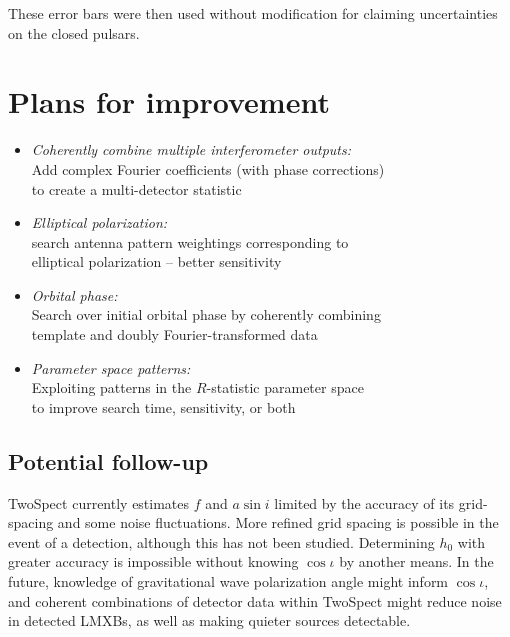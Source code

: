 These error bars were then used without modification for claiming uncertainties on the closed pulsars.



\section{Plans for improvement}

\begin{itemize}
\item \emph{Coherently combine multiple interferometer outputs: }\\
Add complex Fourier coefficients (with phase corrections)\\
to create a multi-detector statistic
\item \emph{Elliptical polarization:}\\
search antenna pattern weightings corresponding to\\
elliptical polarization -- better sensitivity
\item \emph{Orbital phase:}\\
Search over initial orbital phase by coherently combining\\
template and doubly Fourier-transformed data
\item \emph{Parameter space patterns:}\\
Exploiting patterns in the $R$-statistic parameter space\\
to improve search time, sensitivity, or both
\end{itemize}

\subsection{Potential follow-up}

TwoSpect currently estimates $f$ and $a \sin i$ limited by the accuracy of its grid-spacing and some noise fluctuations. More refined grid spacing is possible in the event of a detection, although this has not been studied. Determining $h_0$ with greater accuracy is impossible without knowing $\cos \iota$ by another means. In the future, knowledge of gravitational wave polarization angle might inform $\cos \iota$, and coherent combinations of detector data within TwoSpect might reduce noise in detected LMXBs, as well as making quieter sources detectable. 

